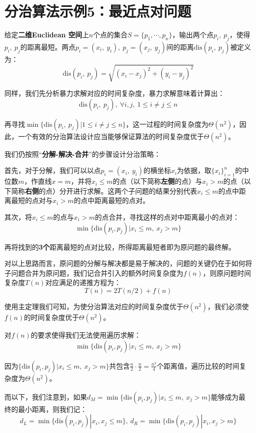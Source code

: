 \documentclass[12pt,a4paper,violet,oneside]{bbe}
\begin{document}
\section{分治算法示例5：最近点对问题}
\begin{example}
	给定\textbf{二维Euclidean 空间}上$n$个点的集合$S=\{p_1,\cdots,p_n\}$，输出两个点$p_i,~p_j$，使得$p_i,~p_j$的距离最短。两点$p_i=(x_i,~y_i),~p_j=(x_j,~y_j)$间的距离$\text{dis}(p_i,~p_j)$被定义为：
	$$
	\text{dis}(p_i,~p_j)=\sqrt{(x_i-x_j)^2+(y_i-y_j)^2}
	$$
\end{example}

同样，我们先分析暴力求解对应的时间复杂度，暴力求解意味着计算出：
$$
\text{dis}(p_i,~p_j),~\forall i,j,~1\leqslant i\ne j\leqslant n
$$

再寻找$\min\{\text{dis}(p_i,~p_j)|1\leqslant i\ne j\leqslant n\}$，这一过程的时间复杂度为$\Theta(n^2)$，因此，一个有效的分治算法设计应当能够保证算法的时间复杂度优于$\Theta(n^2)$。

我们仍按照“\textbf{分解-解决-合并}”的步骤设计分治策略：

首先，对于分解，我们可以以点$p_i=(x_i,~y_i)$的横坐标$x_i$为依据，取$\{x_i\}_{i=1}^n$的中位数$m$，作直线$x=m$，并将$x_i\leqslant m$的点（以下简称\textbf{左侧}的点）与$x_i>m$的点（以下简称\textbf{右侧}的点）分开进行求解。这两个子问题的结果分别代表$x_i\leqslant m$的点中距离最短的点对与$x_i>m$的点中距离最短的点对。

其次，将$x_i\leqslant m$的点与$x_i>m$的点合并，寻找这样的点对中距离最小的点对：
$$
\min\{\text{dis}(p_i,p_j)|x_i\leqslant m,~x_j>m\}
$$

再将找到的\textbf{3个}距离最短的点对比较，所得距离最短者即为原问题的最终解。

对以上思路而言，原问题的分解与解决都是易于解决的，问题的关键仍在于如何将子问题合并为原问题，我们记合并引入的额外时间复杂度为$f(n)$，则原问题时间复杂度$T(n)$对应满足的递推方程为：
$$
T(n)=2T(n/2)+f(n)
$$

使用主定理我们可知，为使分治算法对应的时间复杂度优于$\Theta(n^2)$，我们必须使$f(n)$的时间复杂度优于$\Theta(n^2)$。

对$f(n)$的要求使得我们无法使用遍历求解：
$$
\min\{\text{dis}(p_i,p_j)|x_i\leqslant m,~x_j>m\}
$$

因为$\{\text{dis}(p_i,p_j)|x_i\leqslant m,~x_j>m\}$共包含$\frac{n}{2}\cdot\frac{n}{2}=\frac{n^2}{4}$个距离值，遍历比较的时间复杂度为$\Theta(n^2)$。

而以下，我们注意到，如果$d_M=\min\{\text{dis}(p_i,p_j)|x_i\leqslant m,~x_j>m\}$能够成为最终的最小距离，则我们记：
$$
d_L=\min\{\text{dis}(p_i,p_j)|x_i,x_j\leqslant m\},~d_R=\min\{\text{dis}(p_i,p_j)|x_i,x_j> m\}
$$
\end{document}
